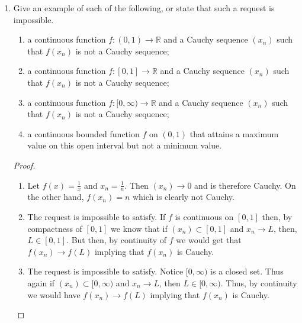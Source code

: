 \begin{enumerate}
\begin{proof}
    \( \Leftarrow \): Suppose there exists \( \epsilon_{0} > 0 \) and \( (x_{n}) \), \( (y_{n}) \) in \( A \) satisfying \( \vert x_{n} - y_{n} \vert \rightarrow 0 \) but \( \vert f(x_{n}) - f(y_{n}) \vert \geq \epsilon_{0} \). Then for \( \epsilon_{0} \) we have that for all \( \delta > 0 \) there exist \( x_{n}, y_{n} \in A \) satisfying \( \vert x_{n} - y_{n} \vert < \delta \). However, by assumption, we have that \( \vert f(x_{n}) - f(y_{n}) \vert \geq \epsilon_{0} \). Therefore, \( f \) is not uniformly continuous on \( A \). 
    \end{proof}
    
    \item Give an example of each of the following, or state that such a request is impossible.
    \begin{enumerate}
        \item a continuous function \( f:(0,1) \rightarrow \mathbb{R} \) and a Cauchy sequence \( (x_{n}) \) such that \( f(x_{n}) \) is not a Cauchy sequence;
        \item a continuous function \( f: [0,1] \rightarrow \mathbb{R} \) and a Cauchy sequence \( (x_{n}) \) such that \( f(x_{n}) \) is not a Cauchy sequence;
        \item a continuous function \( f:[0,\infty) \rightarrow \mathbb{R} \) and a Cauchy sequence \( (x_{n}) \) such that \( f(x_{n}) \) is not a Cauchy sequence;
        \item a continuous bounded function \( f \) on \( (0,1) \) that attains a maximum value on this open interval but not a minimum value. 
    \end{enumerate}
    \begin{proof}
    \begin{enumerate}
        \item Let \( f(x) = \frac{1}{x} \) and \( x_{n} = \frac{1}{n} \). Then \( (x_{n}) \rightarrow 0 \) and is therefore Cauchy. On the other hand, \( f(x_{n}) = n \) which is clearly not Cauchy.
        
        \item The request is impossible to satisfy. If \( f \) is continuous on \( [0,1] \) then, by compactness of \( [0,1] \) we know that if \( (x_{n}) \subset [0,1] \) and \( x_{n} \rightarrow L \), then, \( L \in [0,1]\). But then, by continuity of \( f \) we would get that \( f(x_{n}) \rightarrow f(L) \) implying that \( f(x_{n}) \) is Cauchy.
        
        \item The request is impossible to satisfy. Notice \( [0,\infty) \) is a closed set. Thus again if \( (x_{n}) \subset [0, \infty) \) and \( x_{n} \rightarrow L \), then \( L \in [0,\infty) \). Thus, by continuity we would have \( f(x_{n}) \rightarrow f(L) \) implying that \( f(x_{n}) \) is Cauchy.
        

\end{enumerate}
\end{proof}
\end{enumerate}
